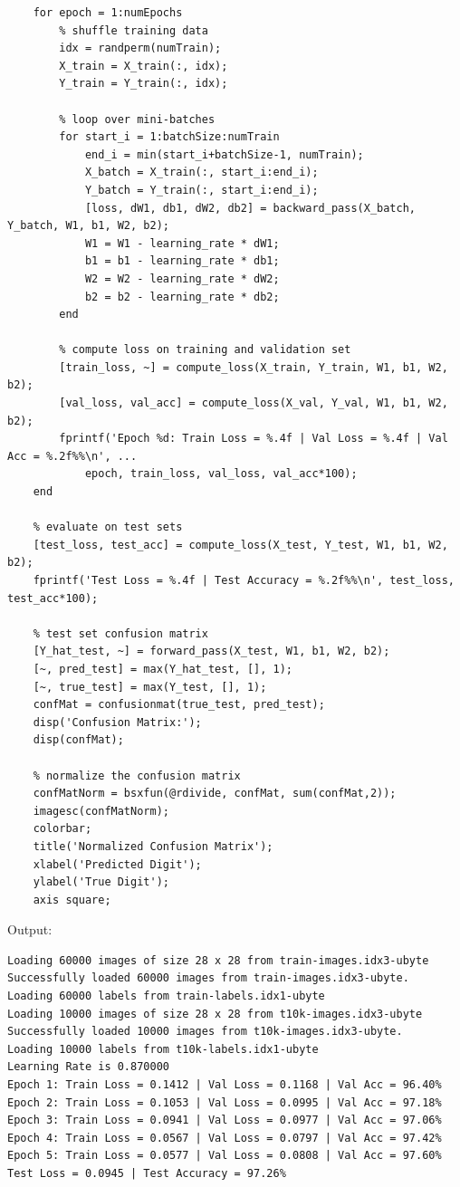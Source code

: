 \documentclass[fleqn]{rbfin}
\begin{document}
\begin{lstlisting}
    for epoch = 1:numEpochs
        % shuffle training data
        idx = randperm(numTrain);
        X_train = X_train(:, idx);
        Y_train = Y_train(:, idx);
        
        % loop over mini-batches
        for start_i = 1:batchSize:numTrain
            end_i = min(start_i+batchSize-1, numTrain);
            X_batch = X_train(:, start_i:end_i);
            Y_batch = Y_train(:, start_i:end_i);
            [loss, dW1, db1, dW2, db2] = backward_pass(X_batch, Y_batch, W1, b1, W2, b2);
            W1 = W1 - learning_rate * dW1;
            b1 = b1 - learning_rate * db1;
            W2 = W2 - learning_rate * dW2;
            b2 = b2 - learning_rate * db2;
        end
        
        % compute loss on training and validation set
        [train_loss, ~] = compute_loss(X_train, Y_train, W1, b1, W2, b2);
        [val_loss, val_acc] = compute_loss(X_val, Y_val, W1, b1, W2, b2);
        fprintf('Epoch %d: Train Loss = %.4f | Val Loss = %.4f | Val Acc = %.2f%%\n', ...
            epoch, train_loss, val_loss, val_acc*100);
    end
    
    % evaluate on test sets
    [test_loss, test_acc] = compute_loss(X_test, Y_test, W1, b1, W2, b2);
    fprintf('Test Loss = %.4f | Test Accuracy = %.2f%%\n', test_loss, test_acc*100);
    
    % test set confusion matrix
    [Y_hat_test, ~] = forward_pass(X_test, W1, b1, W2, b2);
    [~, pred_test] = max(Y_hat_test, [], 1);
    [~, true_test] = max(Y_test, [], 1);
    confMat = confusionmat(true_test, pred_test);
    disp('Confusion Matrix:');
    disp(confMat);
    
    % normalize the confusion matrix
    confMatNorm = bsxfun(@rdivide, confMat, sum(confMat,2));
    imagesc(confMatNorm);
    colorbar;
    title('Normalized Confusion Matrix');
    xlabel('Predicted Digit');
    ylabel('True Digit');
    axis square;
\end{lstlisting}

Output:

\begin{lstlisting}
Loading 60000 images of size 28 x 28 from train-images.idx3-ubyte
Successfully loaded 60000 images from train-images.idx3-ubyte.
Loading 60000 labels from train-labels.idx1-ubyte
Loading 10000 images of size 28 x 28 from t10k-images.idx3-ubyte
Successfully loaded 10000 images from t10k-images.idx3-ubyte.
Loading 10000 labels from t10k-labels.idx1-ubyte
Learning Rate is 0.870000 
Epoch 1: Train Loss = 0.1412 | Val Loss = 0.1168 | Val Acc = 96.40%
Epoch 2: Train Loss = 0.1053 | Val Loss = 0.0995 | Val Acc = 97.18%
Epoch 3: Train Loss = 0.0941 | Val Loss = 0.0977 | Val Acc = 97.06%
Epoch 4: Train Loss = 0.0567 | Val Loss = 0.0797 | Val Acc = 97.42%
Epoch 5: Train Loss = 0.0577 | Val Loss = 0.0808 | Val Acc = 97.60%
Test Loss = 0.0945 | Test Accuracy = 97.26%
\end{lstlisting}
\end{document}
